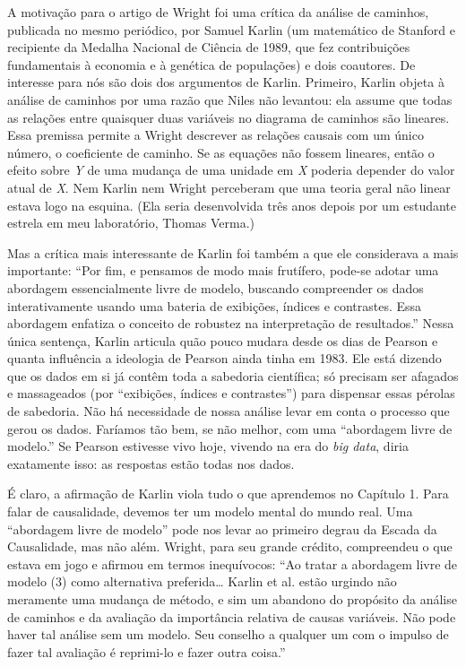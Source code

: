 \documentclass[11pt,a5paper,twoside]{book}
\begin{document}
A motivação para o artigo de Wright foi uma crítica da análise de caminhos, publicada no mesmo periódico, por Samuel Karlin (um matemático de Stanford e recipiente da Medalha Nacional de Ciência de 1989, que fez contribuições fundamentais à economia e à genética de populações) e dois coautores. De interesse para nós são dois dos argumentos de Karlin. Primeiro, Karlin objeta à análise de caminhos por uma razão que Niles não levantou: ela assume que todas as relações entre quaisquer duas variáveis no diagrama de caminhos são lineares. Essa premissa permite a Wright descrever as relações causais com um único número, o coeficiente de caminho. Se as equações não fossem lineares, então o efeito sobre \textit{Y} de uma mudança de uma unidade em \textit{X} poderia depender do valor atual de \textit{X}. Nem Karlin nem Wright perceberam que uma teoria geral não linear estava logo na esquina. (Ela seria desenvolvida três anos depois por um estudante estrela em meu laboratório, Thomas Verma.)

Mas a crítica mais interessante de Karlin foi também a que ele considerava a mais importante: “Por fim, e pensamos de modo mais frutífero, pode-se adotar uma abordagem essencialmente livre de modelo, buscando compreender os dados interativamente usando uma bateria de exibições, índices e contrastes. Essa abordagem enfatiza o conceito de robustez na interpretação de resultados.” Nessa única sentença, Karlin articula quão pouco mudara desde os dias de Pearson e quanta influência a ideologia de Pearson ainda tinha em 1983. Ele está dizendo que os dados em si já contêm toda a sabedoria científica; só precisam ser afagados e massageados (por “exibições, índices e contrastes”) para dispensar essas pérolas de sabedoria. Não há necessidade de nossa análise levar em conta o processo que gerou os dados. Faríamos tão bem, se não melhor, com uma “abordagem livre de modelo.” Se Pearson estivesse vivo hoje, vivendo na era do \textit{big data}, diria exatamente isso: as respostas estão todas nos dados.

É claro, a afirmação de Karlin viola tudo o que aprendemos no Capítulo 1. Para falar de causalidade, devemos ter um modelo mental do mundo real. Uma “abordagem livre de modelo” pode nos levar ao primeiro degrau da Escada da Causalidade, mas não além. Wright, para seu grande crédito, compreendeu o que estava em jogo e afirmou em termos inequívocos: “Ao tratar a abordagem livre de modelo (3) como alternativa preferida… Karlin et al. estão urgindo não meramente uma mudança de método, e sim um abandono do propósito da análise de caminhos e da avaliação da importância relativa de causas variáveis. Não pode haver tal análise sem um modelo. Seu conselho a qualquer um com o impulso de fazer tal avaliação é reprimi-lo e fazer outra coisa.”
\end{document}
